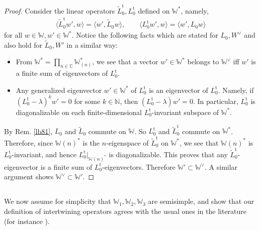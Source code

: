 \documentclass[11pt,b5paper,notitlepage]{article}
\theoremstyle{definition}
\theoremstyle{plain}
\newcommand{\wtd}{\widetilde}
\newcommand{\tr}{\mathrm{t}} %
\newcommand{\bk}[1]{\langle {#1}\rangle}
\newcommand{\Wbb}{\mathbb W}
\newcommand{\Cbb}{\mathbb C}
\newcommand{\Nbb}{\mathbb N}
\numberwithin{equation}{section}
\begin{document}
\begin{proof}
Consider the linear operators $\wtd L_0^\tr,L_0^\tr$ defined on $\Wbb^*$, namely,
\begin{align*}
\bk{\wtd L_0^\tr w',w}=\bk{w',\wtd L_0w},\qquad \bk{L_0^\tr w',w}=\bk{w',L_0w}
\end{align*}
for all $w\in \Wbb,w'\in \Wbb^*$. Notice the following facts which are stated for $L_0,W^\vee$ and also hold for $\wtd L_0,W'$ in a similar way:
\begin{itemize}
\item From $\Wbb^*=\prod_{n\in\Cbb}\Wbb_{(n)}^*$, we see that a vector $w'\in \Wbb^*$ belongs to $\Wbb^\vee$ iff $w'$ is a finite sum of eigenvectors of $L_0^\tr$.
\item Any generalized eigenvector $w'\in\Wbb^*$ of $L_0^\tr$ is an eigenvector of $L_0^\tr$. Namely, if $(L_0^\tr-\lambda)^kw'=0$ for some $k\in\Nbb$, then  $(L_0^\tr-\lambda)w'=0$. In particular, $L_0^\tr$ is diagonalizable  on each finite-dimensional $L_0^\tr$-invariant subspace of $\Wbb^*$. 
\end{itemize}
By Rem. \ref{lb81}, $L_0$ and $\wtd L_0$ commute on $\Wbb$. So $L_0^\tr$ and $\wtd L_0^\tr$ commute on $\Wbb^*$. Therefore, since $\Wbb(n)^*$ is the $n$-eigenspace of $\wtd L_0^\tr$ on $\Wbb^*$, we see that $\Wbb(n)^*$ is $L_0^\tr$-invariant, and hence $L_0^\tr|_{\Wbb(n)^*}$ is diagonalizable. This proves that any $\wtd L_0^\tr$-eigenvector is a finite sum of $L_0^\tr$-eigenvectors. Therefore $\Wbb'\subset\Wbb^\vee$. A similar argument shows $\Wbb^\vee\subset\Wbb'$.
\end{proof}





\subsection{}


We now assume for simplicity that $\Wbb_1,\Wbb_2,\Wbb_3$ are semisimple, and show that our definition of intertwining operators agrees with the usual ones in the literature (for instance \cite{FHL93}). 
\end{document}
